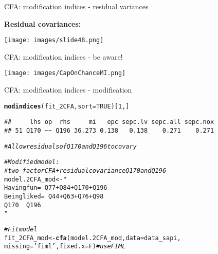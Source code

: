 \documentclass[10pt]{beamer}\usepackage[]{graphicx}\usepackage[]{xcolor}
\makeatletter
\newcommand{\hlnum}[1]{\textcolor[rgb]{0.686,0.059,0.569}{#1}}%
\newcommand{\hlsng}[1]{\textcolor[rgb]{0.192,0.494,0.8}{#1}}%
\newcommand{\hlcom}[1]{\textcolor[rgb]{0.678,0.584,0.686}{\textit{#1}}}%
\newcommand{\hldef}[1]{\textcolor[rgb]{0.345,0.345,0.345}{#1}}%
\newcommand{\hlkwb}[1]{\textcolor[rgb]{0.69,0.353,0.396}{#1}}%
\newcommand{\hlkwc}[1]{\textcolor[rgb]{0.333,0.667,0.333}{#1}}%
\newcommand{\hlkwd}[1]{\textcolor[rgb]{0.737,0.353,0.396}{\textbf{#1}}}%
\newenvironment{kframe}{%
 \def\at@end@of@kframe{}%
 \ifinner\ifhmode%
  \def\at@end@of@kframe{\end{minipage}}%
  \begin{minipage}{\columnwidth}%
 \fi\fi%
 \def\FrameCommand##1{\hskip\@totalleftmargin \hskip-\fboxsep
 \colorbox{shadecolor}{##1}\hskip-\fboxsep
     \hskip-\linewidth \hskip-\@totalleftmargin \hskip\columnwidth}%
 \MakeFramed {\advance\hsize-\width
   \@totalleftmargin\z@ \linewidth\hsize
   \@setminipage}}%
 {\par\unskip\endMakeFramed%
 \at@end@of@kframe}
\newenvironment{knitrout}{}{} %
\makeatother
\begin{document}
%
\begin{frame}{CFA: modification indices - residual variances}

\textbf{Residual covariances:} \vspace{5mm}

\texttt{[image: images/slide48.png]} 

\end{frame}
%
\begin{frame}{CFA: modification indices - be aware!}

\centering
\texttt{[image: images/CapOnChanceMI.png]}      

\end{frame}
%
\begin{frame}[fragile]{CFA: modification indices - modification}

\begin{knitrout}
\color{fgcolor}\begin{kframe}
\begin{alltt}
\hlkwd{modindices}\hldef{(fit_2CFA,} \hlkwc{sort} \hldef{=} \hlnum{TRUE}\hldef{)[}\hlnum{1}\hldef{,]}
\end{alltt}
\begin{verbatim}
##     lhs op  rhs     mi   epc sepc.lv sepc.all sepc.nox
## 51 Q170 ~~ Q196 36.273 0.138   0.138    0.271    0.271
\end{verbatim}
\begin{alltt}
\hlcom{# Allow residuals of Q170 and Q196 to covary}
\end{alltt}
\end{kframe}
\end{knitrout}

\begin{knitrout}
\color{fgcolor}\begin{kframe}
\begin{alltt}
\hlcom{# Modified model: }
\hlcom{# two-factor CFA + residual covariance Q170 and Q196}
\hldef{model.2CFA_mod} \hlkwb{<-} \hlsng{"
 Havingfun  =~ Q77 + Q84 + Q170 + Q196 
 Beingliked =~ Q44 + Q63 + Q76  + Q98
 Q170 ~~ Q196
"}

\hlcom{# Fit model}
\hldef{fit_2CFA_mod} \hlkwb{<-} \hlkwd{cfa}\hldef{(model.2CFA_mod,} \hlkwc{data}\hldef{=data_sapi,}
                    \hlkwc{missing}\hldef{=}\hlsng{'fiml'}\hldef{,} \hlkwc{fixed.x}\hldef{=F)}  \hlcom{# use FIML }
\end{alltt}
\end{kframe}
\end{knitrout}

\end{frame}
\end{document}
